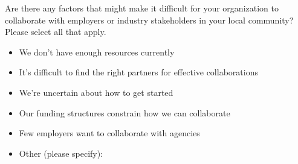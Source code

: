 \documentclass[]{article}
\begin{document}
Are there any factors that might make it difficult for your organization to collaborate with employers or industry stakeholders in your local community? Please select all that apply.

\begin{itemize}
\item[\ding{113}] We don’t have enough resources currently
\item[\ding{113}] It’s difficult to find the right partners for effective collaborations
\item[\ding{113}] We’re uncertain about how to get started
\item[\ding{113}] Our funding structures constrain how we can collaborate
\item[\ding{113}] Few employers want to collaborate with agencies
\item[\ding{113}] Other (please specify):
\end{itemize}
\end{document}
